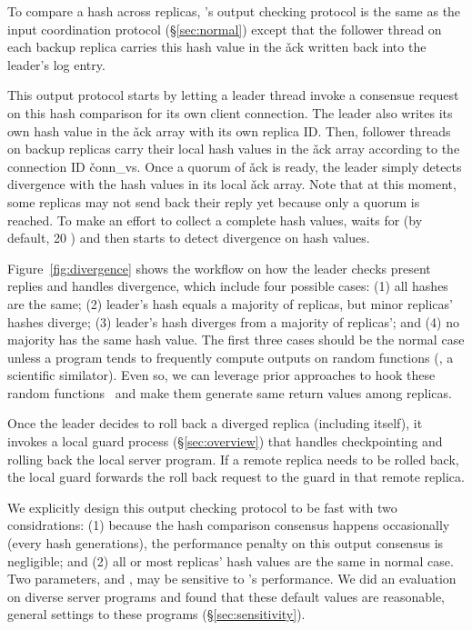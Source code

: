 To compare a hash across replicas, \xxx's output checking protocol is the same 
as the input coordination protocol (\S\ref{sec:normal}) except that the 
follower thread on each backup replica carries this hash value in the \v{ack} 
written back into the leader's log entry.

This output protocol starts by letting a leader thread invoke a consensue 
request on this hash comparison for its own client connection. The leader also 
writes its own hash value in the \v{ack} array with its own replica ID. Then, 
follower threads on backup replicas carry their local hash values in the \v{ack} 
array according to the connection ID \v{conn\_vs}. Once a quorum of \v{ack} 
is ready, the leader simply detects divergence with the hash values in its 
local \v{ack} array. Note that at this moment, some replicas may not send back 
their reply yet because only a quorum is reached. To make an effort to collect 
a complete hash values, \xxx waits for \twait (by default, 20 \us) and then 
starts to detect divergence on hash values.

Figure~\ref{fig:divergence} shows the workflow on how the leader checks 
present replies and handles divergence, which include four possible cases: 
(1) all hashes are the same; (2) leader's hash equals a majority of replicas, 
but minor replicas' hashes diverge; (3) leader's hash diverges from a majority 
of replicas'; and (4) no majority has the same hash value. The first three 
cases should be the normal case unless a program tends to frequently compute 
outputs on random functions (\eg, a scientific similator). Even so, we can 
leverage prior approaches to hook these 
random functions~\cite{paxos:practical,eve:osdi12} and make them generate same 
return values among replicas.

Once the leader decides to roll back a diverged replica (including itself), it 
invokes a local guard process (\S\ref{sec:overview}) that handles 
checkpointing and rolling back the local server program. If a remote replica 
needs to be rolled back, the local guard forwards the roll back request to the 
guard in that remote replica.

We explicitly design this output checking protocol to be fast with two 
considrations: (1) because the hash comparison consensus happens occasionally 
(every \thashcomp hash generations), the performance penalty on this output 
consensus is negligible; and (2) all or most replicas' hash values are 
the same in normal case. Two parameters, \thashcomp and \twait, may be 
sensitive to \xxx's performance. We did an evaluation on diverse server 
programs and found that these default values are reasonable, general settings to 
these programs (\S\ref{sec:sensitivity}).


